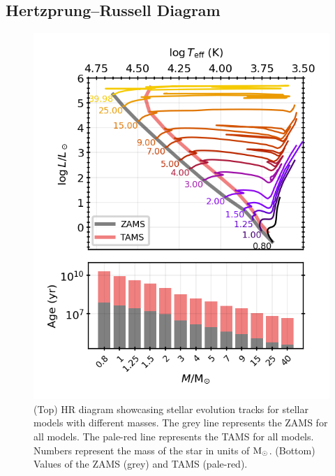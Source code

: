 \subsection{Hertzprung--Russell Diagram}

\begin{figure}[!ht]
    \centering
    \includegraphics[width=1.0\columnwidth]{../figures/HR_plot.png}  %
    \caption{\small (Top) HR diagram showcasing stellar evolution tracks for stellar models with different masses. The grey line represents the ZAMS for all models. The pale-red line represents the TAMS for all models. Numbers represent the mass of the star in units of ${\rm M}_\odot$. (Bottom) Values of the ZAMS (grey) and TAMS (pale-red).}
    \label{fig:HR_plot}
\end{figure}



